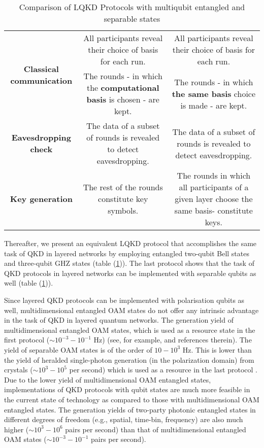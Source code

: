 \documentclass[fleqn,10pt]{wlscirep}
\begin{document}
\begin{table}[hbt!]
\begin{tabular}{|c|c|c|}
\multirow{4}{3cm}{\textbf{Classical communication}} &\multirow{2}{6cm}{All participants reveal their choice of basis for each run.} & \multirow{2}{6cm}{All participants reveal their choice of basis for each run.}\\
&&\\
&\multirow{2}{6cm}{The rounds - in which the \textbf{computational basis} is chosen - are kept.}&\multirow{2}{6cm}{The rounds - in which \textbf{the same basis} choice is made - are kept.}\\
&&\\
\hline

\multirow{2}{3cm}{\textbf{Eavesdropping check}} &\multirow{2}{6cm}{The data of a subset of rounds is revealed to detect eavesdropping.} & \multirow{2}{6cm}{The data of a subset of rounds is revealed to detect eavesdropping.}\\
&&\\
\hline


\multirow{2}{3cm}{\textbf{Key generation}} &\multirow{2}{6cm}{The rest of the rounds constitute key symbols. } & \multirow{2}{6.5cm}{The rounds in which all participants of a given layer choose the same basis- constitute keys. }\\
&&\\
\hline


\end{tabular}
\caption{Comparison of LQKD Protocols with multiqubit entangled and separable states}
\label{qubit}
\end{table}
Thereafter, we present an equivalent  LQKD protocol that accomplishes the same task of QKD in layered networks by employing entangled two-qubit Bell states and  three-qubit GHZ states (table (\ref{qubit})). The last protocol shows that the task of QKD protocols in layered networks can be implemented with separable qubits as well (table (\ref{qubit})).


Since layered QKD protocols can be implemented with polarisation qubits as well,  multidimensional entangled OAM states do not offer any intrinsic advantage in the task of QKD in layered quantum networks.  The generation yield of multidimensional entangled OAM states, which is used as a resource state in the first protocol ($\sim 10^{-3}-10^{-1}$ Hz) (see, for example, \cite{erhard2020advances} and references therein). The yield of separable OAM states is of the order of $10-10^3$ Hz. This is lower  than the yield of heralded single-photon  generation (in the polarization domain) from crystals ($\sim 10^3-10^5$ per second) which is used as a resource in the last protocol \cite{Mosley08, Ljunggren05, Scholz09, fedrizzi2007wavelength}. Due to the lower yield of multidimensional OAM entangled states, implementations of QKD protocols with qubit states are much more feasible in the current state of technology as compared to those with multidimensional OAM entangled states. The generation yields  of two-party photonic entangled states in different degrees of freedom (e.g., spatial, time-bin, frequency) are also much higher  ($\sim 10^3-10^6$ pairs per second) \cite{kim2017two} than that of multidimensional entangled OAM states  ($\sim 10^{-3}-10^{-1}$ pairs per second). 
\end{document}
